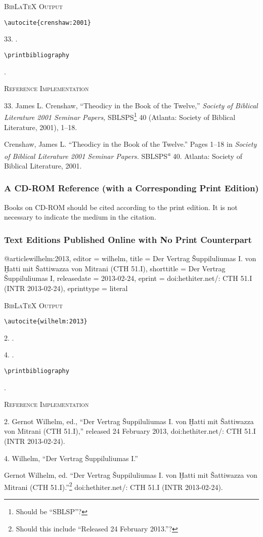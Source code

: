 \documentclass[a4paper]{article}
\newcommand\citetestnp[3]{%
  {\textsc{BibLaTeX Output}\par
   \nobreak
   \texttt{\textbackslash autocite\{#3\}}\par
   \color{biblatex-colour}
   #1. \cite{#3}.\par
   #2. \cite{#3}.\par
   \color{black}
   \texttt{\textbackslash printbibliography}\par
   \color{biblatex-colour}
   \hangindent\bibindent\bibentrycite{#3}.\par}}
\newcommand\citetestnsnp[2]{%
  {\textsc{BibLaTeX Output}\par
   \nobreak
   \texttt{\textbackslash autocite\{#2\}}\par
   \color{biblatex-colour}
   #1. \cite{#2}.\par
   \color{black}
   \texttt{\textbackslash printbibliography}\par
   \color{biblatex-colour}
   \hangindent\bibindent\bibentrycite{#2}.\par}}
\newenvironment{refimp}{%
  \begin{minipage}{\linewidth}
    \setlength{\parskip}{1ex}
    \textsc{Reference Implementation}\par
    \nobreak
    \color{reference-colour}
}{\end{minipage}}
\newenvironment{vb}{%
  \setlength{\parskip}{0pt}
  \verbatim}{\endverbatim}
\begin{document}
\citetestnsnp{33}{crenshaw:2001}

\begin{refimp}
  33. James L. Crenshaw, “Theodicy in the Book of the Twelve,” \emph{Society
  of Biblical Literature 2001 Seminar Papers,} SBLSPS\footnote{Should be
  “SBLSP”?} 40 (Atlanta: Society of Biblical Literature, 2001), 1–18.
  
  \hangindent\bibindent Crenshaw, James L. “Theodicy in the Book of the
  Twelve.” Pages 1–18 in \emph{Society of Biblical Literature 2001 Seminar
  Papers.} SBLSPS\textsuperscript{\emph{a}} 40. Atlanta: Society of Biblical
  Literature, 2001.
\end{refimp}

\subsubsection{A CD-ROM Reference (with a Corresponding Print Edition)}

Books on CD-ROM should be cited according to the print edition. It is not
necessary to indicate the medium in the citation.

\subsubsection{Text Editions Published Online with No Print Counterpart}

\begin{vb}
@article{wilhelm:2013,
  editor = wilhelm,
  title = {Der Vertrag Šuppiluliumas I. von Ḫatti mit
           Šattiwazza von Mitrani (CTH 51.I)},
  shorttitle = {Der Vertrag Šuppiluliumas I},
  releasedate = {2013-02-24},
  eprint = {doi:hethiter.net/: CTH 51.I (INTR 2013-02-24)},
  eprinttype = {literal}
}
\end{vb}

\citetestnp{2}{4}{wilhelm:2013}

\begin{refimp}
  2. Gernot Wilhelm, ed., “Der Vertrag Šuppiluliumas I. von Ḫatti mit
  Šattiwazza von Mitrani (CTH 51.I),” released 24 February 2013,
  doi:hethiter.net/: CTH 51.I (INTR 2013-02-24).

  4. Wilhelm, “Der Vertrag Šuppiluliumas I.”

  \hangindent\bibindent Gernot Wilhelm, ed. “Der Vertrag Šuppiluliumas I. von
  Ḫatti mit Šattiwazza von Mitrani (CTH 51.I).”\footnote{Should this include
  “Released 24 February 2013.”?} doi:hethiter.net/: CTH 51.I
  (INTR 2013-02-24).
\end{refimp}
\end{document}
